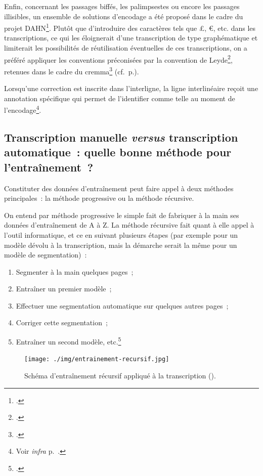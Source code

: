 \documentclass[a4paper,12pt,twoside]{book}
\begin{document}
				Enfin, concernant les passages biffés, les palimpsestes ou encore les passages illisibles, un ensemble de solutions d'encodage a été proposé dans le cadre du projet DAHN\footcite{chiffoleauFewTipsReading}. Plutôt que d'introduire des caractères tels que £, €, etc. dans les transcriptions, ce qui les éloignerait d'une transcription de type graphématique et limiterait les possibilités de réutilisation éventuelles de ces transcriptions, on a préféré appliquer les conventions préconisées par la convention de Leyde\footcite{leidenConvention}, retenues dans le cadre du \gls{cremma}\footcite{pincheSeminaireCreationModele2021a} (cf.~p.\pageref{biffes}).
				
				Lorsqu'une correction est inscrite dans l'interligne, la ligne interlinéaire reçoit une annotation spécifique qui permet de l'identifier comme telle au moment de l'encodage\footnote{Voir \textit{infra} p.~\pageref{interlinear}.}.
								
			\subsection[Transcription manuelle \textit{versus} transcription automatique]{Transcription manuelle \textit{versus} transcription automatique~: quelle bonne méthode pour l'entraînement~?}
				Constituter des données d'entraînement peut faire appel à deux méthodes principales~: la méthode progressive ou la méthode récursive.
				
				On entend par méthode progressive le simple fait de fabriquer à la main ses données d'entraînement de A à Z. La méthode récursive fait quant à elle appel à l'outil informatique, et ce en suivant plusieurs étapes (par exemple pour un modèle dévolu à la transcription, mais la démarche serait la même pour un modèle de \gls{segmentation})~:
				
				\begin{enumerate}
					\item Segmenter à la main quelques pages~;
					\item Entraîner un premier modèle~;
					\item Effectuer une \gls{segmentation} automatique sur quelques autres pages~;
					\item Corriger cette \gls{segmentation}~;
					\item Entraîner un second modèle, etc.\footcite{stokesEScriptoriumVREManuscript2021}
				\end{enumerate}
				
				\begin{figure}[!h]
					\centering
					\texttt{[image: ./img/entrainement-recursif.jpg]}
					\caption{Schéma d'entraînement récursif appliqué à la transcription (\cite{pincheHTRPresentationProblematiques2021}).}
					\label{fig}
				\end{figure}
							
\end{document}
